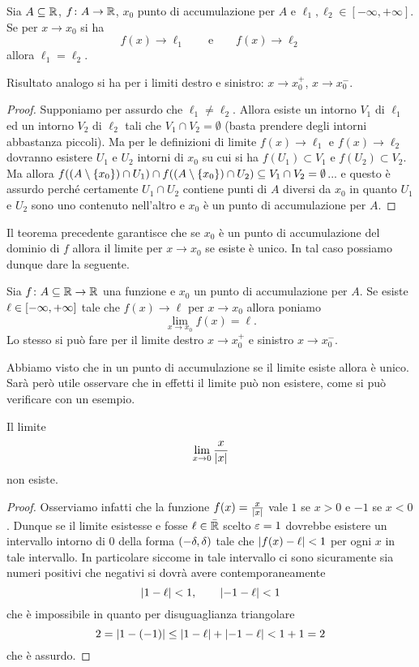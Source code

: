 \begin{theorem}
\mymark{*}
Sia $A\subseteq {\mathbb R}$, $f\colon A \to {\mathbb R}$, $x_0$
punto di accumulazione per $A$ e $\ell_1, \ell_2\in [-\infty,+\infty]$.
Se per $x\to x_0$ si ha
\[
  f(x) \to \ell_1 \qquad\text{e}\qquad f(x) \to \ell_2
\]
allora $\ell_1=\ell_2$.

Risultato analogo si ha per i limiti destro e sinistro: $x\to x_0^+$, 
$x\to x_0^-$.
\end{theorem}
%
\begin{proof}
\mymark{*}
Supponiamo per assurdo che $\ell_1\neq \ell_2$.
Allora esiste un intorno $V_1$ di $\ell_1$ ed un intorno $V_2$ di $\ell_2$
tali che $V_1\cap V_2 = \emptyset$ (basta prendere degli intorni abbastanza piccoli). 
Ma per le definizioni di limite $f(x)\to \ell_1$ e $f(x)\to \ell_2$ 
dovranno esistere $U_1$ e $U_2$ intorni di $x_0$ su cui si ha 
$f(U_1)\subset V_1$ e $f(U_2)\subset V_2$. 
Ma allora $f((A\setminus{\left\{ x_0 \right\}})\cap U_1)\cap f((A\setminus{\left\{ x_0 \right\}})\cap U_2)\subseteq V_1\cap V_2 = \emptyset$... 
e questo è assurdo perché certamente $U_1\cap U_2$ 
contiene punti di $A$ diversi da $x_0$ in quanto 
$U_1$ e $U_2$ sono uno contenuto nell'altro e $x_0$ 
è un punto di accumulazione per $A$.
\end{proof}

Il teorema precedente garantisce che se $x_0$ è un punto di accumulazione 
del dominio di $f$ allora il limite per $x\to x_0$ se esiste è unico. 
In tal caso possiamo dunque dare la seguente.
%
\begin{definition}
Sia $f\colon A\subseteq {\mathbb R} \to {\mathbb R}$ una funzione e $x_0$ 
un punto di accumulazione per $A$. 
Se esiste $\ell\in\left[-\infty,+\infty\right]$ tale che
$f(x)\to \ell$ per $x\to x_0$ allora poniamo
\[
  \lim_{x\to x_0} f(x) = \ell.
\]
Lo stesso si può fare per il limite destro $x\to x_0^+$ 
e sinistro $x\to x_0^-$.
\end{definition}

Abbiamo visto che in un punto di accumulazione se il limite 
esiste allora è unico.
Sarà però utile osservare che in effetti il limite può non 
esistere, come si può verificare con un esempio.

\begin{example}
Il limite 
\[
  \lim_{x\to 0} \frac{x}{{\left|x\right|}}
\]
non esiste. 
\end{example}
\begin{proof}
Osserviamo infatti che la funzione $f(x) = \frac{x}{{\left|x\right|}}$ 
vale $1$ se $x>0$ e $-1$ se $x<0$.
Dunque se il limite esistesse e fosse $\ell\in \bar {{\mathbb R}}$ 
scelto $\varepsilon=1$ dovrebbe esistere un intervallo intorno di $0$ 
della forma $\left(-\delta,\delta\right)$ tale che 
${\left|f(x)-\ell\right|}<1$ per ogni $x$ in tale intervallo.
In particolare siccome in tale intervallo ci sono sicuramente 
sia numeri positivi che negativi si dovrà avere 
contemporaneamente
\[
  {\left|1-\ell\right|}<1, \qquad 
  {\left|-1-\ell\right|}<1  
\]
che è impossibile in quanto per disuguaglianza triangolare 
\[
 2 = {\left|1-(-1)\right|} 
 \le {\left|1-\ell\right|} + {\left|-1-\ell\right|}
 < 1 + 1 = 2
\]
che è assurdo.
\end{proof}


